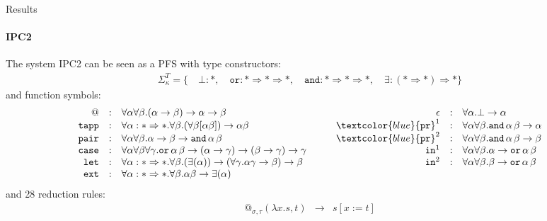 \documentclass[10pt,presentation,color=names]{beamer}
\newcommand{\arrkind}{\Rightarrow}
\newcommand{\arrtype}{\rightarrow}
\newcommand{\abs}[2]{\lambda #1.#2}
\newcommand{\red}{\longrightarrow}
\newcommand{\symb}[1]{\textcolor{blue}{\mathtt{#1}}}
\newcommand{\proj}{\symb{pr}}
\begin{document}
\begin{frame}{Results}
  \framesubtitle{IPC2}

  The system IPC2 can be seen as a PFS with type constructors:
  \[
  \begin{array}{c}
    \Sigma^T_\kappa = \{\quad
    \bot : *,\quad
    \mathtt{or} : * \arrkind * \arrkind *,\quad
    \mathtt{and} : * \arrkind * \arrkind *,\quad
    \exists : (* \arrkind *) \arrkind *
    \}
  \end{array}
  \]
  and function symbols:
  \[
  \begin{array}{rclcrcl}
    @ & : & \forall \alpha \forall \beta . (\alpha \arrtype \beta) \arrtype \alpha \arrtype \beta &
    \quad &
    \epsilon & : & \forall \alpha . \bot \arrtype \alpha \\

    \mathtt{tapp} & : & \forall \alpha : * \arrkind * . \forall \beta .
    (\forall \beta [\alpha \beta]) \arrtype \alpha \beta &
    \quad &
    \proj^1 & : & \forall \alpha \forall \beta . \mathtt{and}\, \alpha\, \beta \arrtype \alpha \\

    \mathtt{pair} & : & \forall \alpha \forall \beta . \alpha \arrtype \beta \arrtype
    \mathtt{and}\, \alpha\, \beta &
    \quad &
    \proj^2 & : & \forall \alpha \forall \beta . \mathtt{and}\, \alpha\, \beta \arrtype \beta \\

    \mathtt{case} & : & \forall \alpha \forall \beta \forall \gamma . \mathtt{or}\, \alpha\, \beta \arrtype
    (\alpha \arrtype \gamma) \arrtype (\beta \arrtype \gamma) \arrtype \gamma &
    \quad &
    \mathtt{in}^1 & : & \forall \alpha \forall \beta . \alpha \arrtype
    \mathtt{or}\, \alpha\, \beta \\

    \mathtt{let} & : & \forall \alpha : * \arrkind * . \forall \beta .
    (\exists (\alpha)) \arrtype
    (\forall \gamma . \alpha \gamma \arrtype \beta) \arrtype \beta &
    \quad &
    \mathtt{in}^2 & : & \forall \alpha \forall \beta . \beta \arrtype
    \mathtt{or}\, \alpha\, \beta \\

    \mathtt{ext} & : & \forall \alpha : * \arrkind * . \forall \beta . \alpha \beta \arrtype
    \exists (\alpha)
  \end{array}
  \]
  and 28 reduction rules:
\[
\begin{array}{rcl}
@_{\sigma,\tau}(\abs{x}{s},t) & \red & s[x:=t] \\


\end{array}\]
\end{frame}
\end{document}

